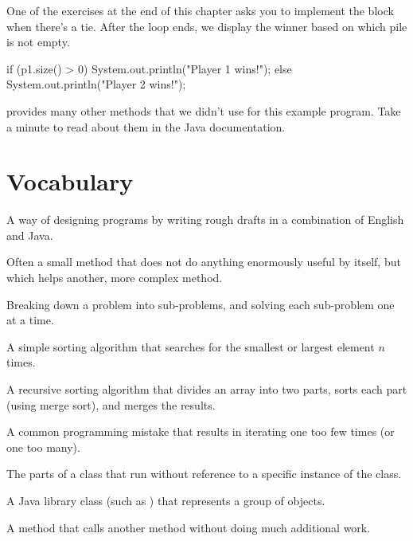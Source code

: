 One of the exercises at the end of this chapter asks you to implement the  block when there's a tie.
After the  loop ends, we display the winner based on which pile is not empty.

\begin{code}
if (p1.size() > 0) {
    System.out.println("Player 1 wins!");
} else {
    System.out.println("Player 2 wins!");
}
\end{code}

 provides many other methods that we didn't use for this example program.
Take a minute to read about them in the Java documentation.


\section{Vocabulary}

\begin{description}

A way of designing programs by writing rough drafts in a combination of English and Java.

Often a small method that does not do anything enormously useful by itself, but which helps another, more complex method.

Breaking down a problem into sub-problems, and solving each sub-problem one at a time.

A simple sorting algorithm that searches for the smallest or largest element $n$ times.

A recursive sorting algorithm that divides an array into two parts, sorts each part (using merge sort), and merges the results.

A common programming mistake that results in iterating one too few times (or one too many).

The parts of a class that run without reference to a specific instance of the class.

A Java library class (such as ) that represents a group of objects.

A method that calls another method without doing much additional work.


\end{description}


